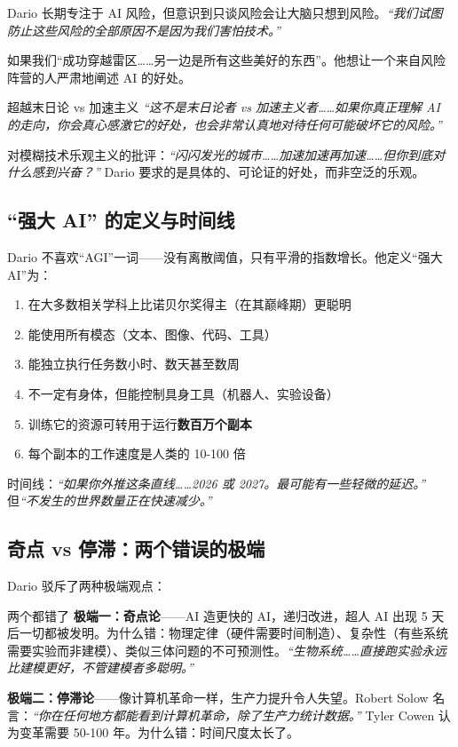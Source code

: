 \documentclass[a4paper]{article}
\begin{document}
Dario 长期专注于 AI 风险，但意识到只谈风险会让大脑只想到风险。\textit{``我们试图防止这些风险的全部原因不是因为我们害怕技术。''}

如果我们``成功穿越雷区……另一边是所有这些美好的东西''。他想让一个来自风险阵营的人严肃地阐述 AI 的好处。

\begin{importantbox}{超越末日论 vs 加速主义}
\textit{``这不是末日论者 vs 加速主义者……如果你真正理解 AI 的走向，你会真心感激它的好处，也会非常认真地对待任何可能破坏它的风险。''}

对模糊技术乐观主义的批评：\textit{``闪闪发光的城市……加速加速再加速……但你到底对什么感到兴奋？''} Dario 要求的是具体的、可论证的好处，而非空泛的乐观。
\end{importantbox}

\subsection{``强大 AI'' 的定义与时间线}

Dario 不喜欢``AGI''一词——没有离散阈值，只有平滑的指数增长。他定义``强大 AI''为：

\begin{enumerate}
    \item 在大多数相关学科上比诺贝尔奖得主（在其巅峰期）更聪明
    \item 能使用所有模态（文本、图像、代码、工具）
    \item 能独立执行任务数小时、数天甚至数周
    \item 不一定有身体，但能控制具身工具（机器人、实验设备）
    \item 训练它的资源可转用于运行\textbf{数百万个副本}
    \item 每个副本的工作速度是人类的 10-100 倍
\end{enumerate}

时间线：\textit{``如果你外推这条直线……2026 或 2027。最可能有一些轻微的延迟。''} 但\textit{``不发生的世界数量正在快速减少。''}

\subsection{奇点 vs 停滞：两个错误的极端}

Dario 驳斥了两种极端观点：

\begin{warningbox}{两个都错了}
\textbf{极端一：奇点论}——AI 造更快的 AI，递归改进，超人 AI 出现 5 天后一切都被发明。为什么错：物理定律（硬件需要时间制造）、复杂性（有些系统需要实验而非建模）、类似三体问题的不可预测性。\textit{``生物系统……直接跑实验永远比建模更好，不管建模者多聪明。''}

\textbf{极端二：停滞论}——像计算机革命一样，生产力提升令人失望。Robert Solow 名言：\textit{``你在任何地方都能看到计算机革命，除了生产力统计数据。''} Tyler Cowen 认为变革需要 50-100 年。为什么错：时间尺度太长了。
\end{warningbox}
\end{document}
